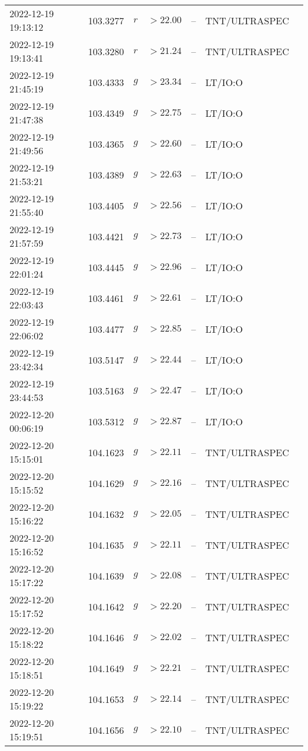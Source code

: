 \documentclass{nature_plusfigure}
\begin{document}
\begin{supplement}
\begin{center}
\begin{longtable}{lllllll}
2022-12-19 19:13:12 & 103.3277 & $r$ & $>22.00$ & -- & TNT/ULTRASPEC &  \\ 
2022-12-19 19:13:41 & 103.3280 & $r$ & $>21.24$ & -- & TNT/ULTRASPEC &  \\ 
2022-12-19 21:45:19 & 103.4333 & $g$ & $>23.34$ & -- & LT/IO:O &  \\ 
2022-12-19 21:47:38 & 103.4349 & $g$ & $>22.75$ & -- & LT/IO:O &  \\ 
2022-12-19 21:49:56 & 103.4365 & $g$ & $>22.60$ & -- & LT/IO:O &  \\ 
2022-12-19 21:53:21 & 103.4389 & $g$ & $>22.63$ & -- & LT/IO:O &  \\ 
2022-12-19 21:55:40 & 103.4405 & $g$ & $>22.56$ & -- & LT/IO:O &  \\ 
2022-12-19 21:57:59 & 103.4421 & $g$ & $>22.73$ & -- & LT/IO:O &  \\ 
2022-12-19 22:01:24 & 103.4445 & $g$ & $>22.96$ & -- & LT/IO:O &  \\ 
2022-12-19 22:03:43 & 103.4461 & $g$ & $>22.61$ & -- & LT/IO:O &  \\ 
2022-12-19 22:06:02 & 103.4477 & $g$ & $>22.85$ & -- & LT/IO:O &  \\ 
2022-12-19 23:42:34 & 103.5147 & $g$ & $>22.44$ & -- & LT/IO:O &  \\ 
2022-12-19 23:44:53 & 103.5163 & $g$ & $>22.47$ & -- & LT/IO:O &  \\ 
2022-12-20 00:06:19 & 103.5312 & $g$ & $>22.87$ & -- & LT/IO:O &  \\ 
2022-12-20 15:15:01 & 104.1623 & $g$ & $>22.11$ & -- & TNT/ULTRASPEC &  \\ 
2022-12-20 15:15:52 & 104.1629 & $g$ & $>22.16$ & -- & TNT/ULTRASPEC &  \\ 
2022-12-20 15:16:22 & 104.1632 & $g$ & $>22.05$ & -- & TNT/ULTRASPEC &  \\ 
2022-12-20 15:16:52 & 104.1635 & $g$ & $>22.11$ & -- & TNT/ULTRASPEC &  \\ 
2022-12-20 15:17:22 & 104.1639 & $g$ & $>22.08$ & -- & TNT/ULTRASPEC &  \\ 
2022-12-20 15:17:52 & 104.1642 & $g$ & $>22.20$ & -- & TNT/ULTRASPEC &  \\ 
2022-12-20 15:18:22 & 104.1646 & $g$ & $>22.02$ & -- & TNT/ULTRASPEC &  \\ 
2022-12-20 15:18:51 & 104.1649 & $g$ & $>22.21$ & -- & TNT/ULTRASPEC &  \\ 
2022-12-20 15:19:22 & 104.1653 & $g$ & $>22.14$ & -- & TNT/ULTRASPEC &  \\ 
2022-12-20 15:19:51 & 104.1656 & $g$ & $>22.10$ & -- & TNT/ULTRASPEC &  \\ 

\end{longtable}
\end{center}
\end{supplement}
\end{document}
